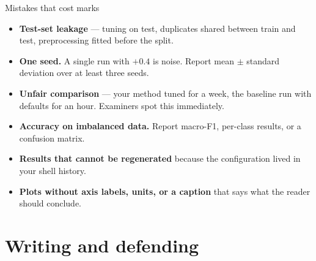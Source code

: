 \documentclass[aspectratio=169,11pt]{beamer}
\newcommand{\key}[1]{\textbf{\color{brand}#1}}
\begin{document}
\begin{frame}{Mistakes that cost marks}
\begin{alertblock}{}
\begin{itemize}
  \item \key{Test-set leakage} --- tuning on test, duplicates shared between
        train and test, preprocessing fitted before the split.
  \item \key{One seed.} A single run with $+0.4$ is noise. Report mean $\pm$
        standard deviation over at least three seeds.
  \item \key{Unfair comparison} --- your method tuned for a week, the baseline
        run with defaults for an hour. Examiners spot this immediately.
  \item \key{Accuracy on imbalanced data.} Report macro-F1, per-class results,
        or a confusion matrix.
  \item \key{Results that cannot be regenerated} because the configuration
        lived in your shell history.
  \item \key{Plots without axis labels, units, or a caption} that says what the
        reader should conclude.
\end{itemize}
\end{alertblock}
\end{frame}

\section{Writing and defending}
\end{document}
